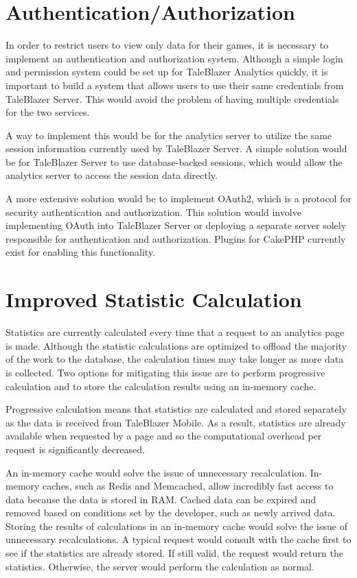 \section{Authentication/Authorization}

In order to restrict users to view only data for their games, it is necessary to implement an authentication and authorization system. Although a simple login and permission system could be set up for TaleBlazer Analytics quickly, it is important to build a system that allows users to use their same credentials from TaleBlazer Server. This would avoid the problem of having multiple credentials for the two services. 

A way to implement this would be for the analytics server to utilize the same session information currently used by TaleBlazer Server. A simple solution would be for TaleBlazer Server to use database-backed sessions, which would allow the analytics server to access the session data directly.

A more extensive solution would be to implement OAuth2, which is a protocol for security authentication and authorization. This solution would involve implementing OAuth into TaleBlazer Server or deploying a separate server solely responsible for authentication and authorization. Plugins for CakePHP currently exist for enabling this functionality. 

\section{Improved Statistic Calculation}

Statistics are currently calculated every time that a request to an analytics page is made. Although the statistic calculations are optimized to offload the majority of the work to the database, the calculation times may take longer as more data is collected. Two options for mitigating this issue are to perform progressive calculation and to store the calculation results using an in-memory cache. 

Progressive calculation means that statistics are calculated and stored separately as the data is received from TaleBlazer Mobile. As a result, statistics are already available when requested by a page and so the computational overhead per request is significantly decreased. 

An in-memory cache would solve the issue of unnecessary recalculation. In-memory caches, such as Redis and Memcached, allow incredibly fast access to data because the data is stored in RAM. Cached data can be expired and removed based on conditions set by the developer, such as newly arrived data. Storing the results of calculations in an in-memory cache would solve the issue of unnecessary recalculations. A typical request would consult with the cache first to see if the statistics are already stored. If still valid, the request would return the statistics. Otherwise, the server would perform the calculation as normal.

